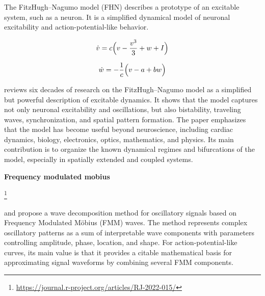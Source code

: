 \documentclass{book}
\providecommand{\ProjectDeepHeading}[2]{%
    \par\medskip\noindent\textbf{#2}\par\smallskip
}
\providecommand{\seeherefooter}[1]{\footnote{\url{#1}}}
\begin{document}

The FitzHugh--Nagumo model (FHN)\cite{cebrian-lacasa-2025-six-decades-of-the-fitzhugh-nagumo-model-a-guide-through-its-spatio-temporal-dynamics-and-influence-across-disciplines} describes a prototype of an excitable system, such as a neuron.
    It is a simplified dynamical model of neuronal excitability and action-potential-like behavior.
    
    \begin{equation}
        \dot{v}
        =
        c
        \Bigl(
        v
        -
        \frac{v^{3}}{3}
        +
        w
        +
        I
        \Bigr)
    \end{equation}
    
    \begin{equation}
        \dot{w}
        =
        -
        \frac{1}{c}
        \Bigl(
        v
        -
        a
        +
        bw
        \Bigr)
    \end{equation}
    
    \cite{cebrian-lacasa-2025-six-decades-of-the-fitzhugh-nagumo-model-a-guide-through-its-spatio-temporal-dynamics-and-influence-across-disciplines}
    reviews six decades of research on the FitzHugh--Nagumo model as a simplified but powerful description of excitable dynamics.
    It shows that the model captures not only neuronal excitability and oscillations, but also bistability, traveling waves, synchronization, and spatial pattern formation.
    The paper emphasizes that the model has become useful beyond neuroscience, including cardiac dynamics, biology, electronics, optics, mathematics, and physics.
    Its main contribution is to organize the known dynamical regimes and bifurcations of the model, especially in spatially extended and coupled systems.

\ProjectDeepHeading{8}{Frequency modulated mobius}


\seeherefooter{https://journal.r-project.org/articles/RJ-2022-015/}

   \cite{rueda-2021-a-novel-wave-decomposition-for-oscillatory-signals}
   and
   \cite{rodriguez-collado-2021-identification-of-action-potential-waveforms}
   propose a wave decomposition method for oscillatory signals based on Frequency Modulated M\"obius (FMM) waves.
   The method represents complex oscillatory patterns as a sum of interpretable wave components with parameters controlling amplitude, phase, location, and shape.
   For action-potential-like curves, its main value is that it provides a citable mathematical basis for approximating signal waveforms by combining several FMM components.
\end{document}
